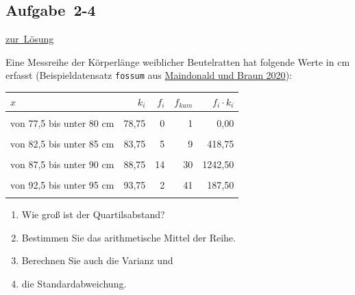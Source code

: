 \documentclass[
  11pt,
  ngerman,
  a4paper,
]{report}
\providecommand{\tightlist}{%
  \setlength{\itemsep}{0pt}\setlength{\parskip}{0pt}}
\begin{document}
\hypertarget{aufgabe-2-4}{%
\subsection{Aufgabe~2-4}\label{aufgabe-2-4}}

\protect\hyperlink{loesung-2-4}{zur~Lösung}

Eine Messreihe der Körperlänge weiblicher Beutelratten hat folgende Werte in cm erfasst (Beispieldatensatz \texttt{fossum} aus \protect\hyperlink{ref-daag}{Maindonald und Braun 2020}):

\begin{table}
\centering
\begin{tabular}{>{\raggedright\arraybackslash}p{8cm}rrrr}
\toprule
\textbf{$x$} & \textbf{$k_i$} & \textbf{$f_i$} & \textbf{$f_{kum}$} & \textbf{$f_i \cdot k_i$}\\
\midrule
\cellcolor{gray!6}{von 75 bis unter 77,5 cm} & \cellcolor{gray!6}{76,25} & \cellcolor{gray!6}{1} & \cellcolor{gray!6}{1} & \cellcolor{gray!6}{76,25}\\
von 77,5 bis unter 80 cm & 78,75 & 0 & 1 & 0,00\\
\cellcolor{gray!6}{von 80 bis unter 82,5 cm} & \cellcolor{gray!6}{81,25} & \cellcolor{gray!6}{3} & \cellcolor{gray!6}{4} & \cellcolor{gray!6}{243,75}\\
von 82,5 bis unter 85 cm & 83,75 & 5 & 9 & 418,75\\
\cellcolor{gray!6}{von 85 bis unter 87,5 cm} & \cellcolor{gray!6}{86,25} & \cellcolor{gray!6}{7} & \cellcolor{gray!6}{16} & \cellcolor{gray!6}{603,75}\\
von 87,5 bis unter 90 cm & 88,75 & 14 & 30 & 1242,50\\
\cellcolor{gray!6}{von 90 bis unter 92,5 cm} & \cellcolor{gray!6}{91,25} & \cellcolor{gray!6}{9} & \cellcolor{gray!6}{39} & \cellcolor{gray!6}{821,25}\\
von 92,5 bis unter 95 cm & 93,75 & 2 & 41 & 187,50\\
\cellcolor{gray!6}{von 95 bis unter 97,5 cm} & \cellcolor{gray!6}{96,25} & \cellcolor{gray!6}{2} & \cellcolor{gray!6}{43} & \cellcolor{gray!6}{192,50}\\
\bottomrule
\end{tabular}
\end{table}

\begin{enumerate}
\def\labelenumi{\alph{enumi})}
\tightlist
\item
  Wie groß ist der Quartilsabstand?
\item
  Bestimmen Sie das arithmetische Mittel der Reihe.
\item
  Berechnen Sie auch die Varianz und
\item
  die Standardabweichung.
\end{enumerate}
\end{document}

